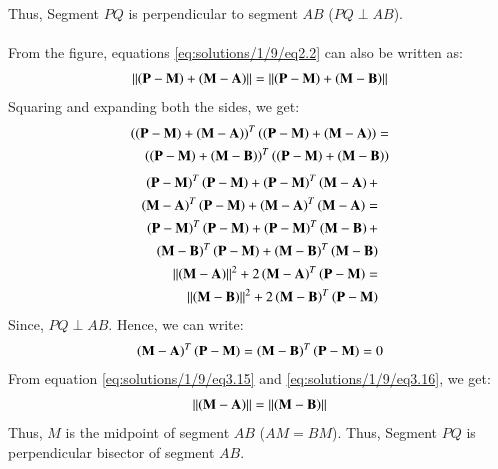 Thus, Segment $PQ$ is perpendicular to segment $AB$ ($PQ \perp AB$).\\ \\
From the figure, equations \ref{eq:solutions/1/9/eq2.2} can also be written as:
\begin{align}
    \left\lVert\left(\mathbf{P}-\mathbf{M}\right)+\left(\mathbf{M}-\mathbf{A}\right)\right\rVert=\left\lVert\left(\mathbf{P}-\mathbf{M}\right)+\left(\mathbf{M}-\mathbf{B}\right)\right\rVert
\end{align}
Squaring and expanding both the sides, we get:
\begin{align}
\left(\left(\mathbf{P}-\mathbf{M}\right)+\left(\mathbf{M}-\mathbf{A}\right)\right)^T\left(\left(\mathbf{P}-\mathbf{M}\right)+\left(\mathbf{M}-\mathbf{A}\right)\right) = \nonumber \\
\left(\left(\mathbf{P}-\mathbf{M}\right)+\left(\mathbf{M}-\mathbf{B}\right)\right)^T\left(\left(\mathbf{P}-\mathbf{M}\right)+\left(\mathbf{M}-\mathbf{B}\right)\right)
\end{align}
\begin{align}
\left(\mathbf{P}-\mathbf{M}\right)^T\left(\mathbf{P}-\mathbf{M}\right)+\left(\mathbf{P}-\mathbf{M}\right)^T\left(\mathbf{M}-\mathbf{A}\right)+ \nonumber \\\left(\mathbf{M}-\mathbf{A}\right)^T\left(\mathbf{P}-\mathbf{M}\right)+\left(\mathbf{M}-\mathbf{A}\right)^T\left(\mathbf{M}-\mathbf{A}\right) = \nonumber \\
\left(\mathbf{P}-\mathbf{M}\right)^T\left(\mathbf{P}-\mathbf{M}\right)+\left(\mathbf{P}-\mathbf{M}\right)^T\left(\mathbf{M}-\mathbf{B}\right)+ \nonumber \\\left(\mathbf{M}-\mathbf{B}\right)^T\left(\mathbf{P}-\mathbf{M}\right)+\left(\mathbf{M}-\mathbf{B}\right)^T\left(\mathbf{M}-\mathbf{B}\right)\\
\left\lVert\left(\mathbf{M}-\mathbf{A}\right)\right\rVert^2+2\left(\mathbf{M}-\mathbf{A}\right)^T\left(\mathbf{P}-\mathbf{M}\right) = \nonumber \\
\left\lVert\left(\mathbf{M}-\mathbf{B}\right)\right\rVert^2+2\left(\mathbf{M}-\mathbf{B}\right)^T\left(\mathbf{P}-\mathbf{M}\right) \label{eq:solutions/1/9/eq3.15}
\end{align}
Since, $PQ\perp AB$. Hence, we can write:
\begin{align}
\left(\mathbf{M}-\mathbf{A}\right)^T\left(\mathbf{P}-\mathbf{M}\right)=\left(\mathbf{M}-\mathbf{B}\right)^T\left(\mathbf{P}-\mathbf{M}\right)=0 \label{eq:solutions/1/9/eq3.16}
\end{align}
From equation \ref{eq:solutions/1/9/eq3.15} and \ref{eq:solutions/1/9/eq3.16}, we get:
\begin{align}
    \left\lVert\left(\mathbf{M}-\mathbf{A}\right)\right\rVert=\left\lVert\left(\mathbf{M}-\mathbf{B}\right)\right\rVert
\end{align}
Thus, $M$ is the midpoint of segment $AB$ ($AM=BM$).
Thus, Segment $PQ$ is perpendicular bisector of segment $AB$.
